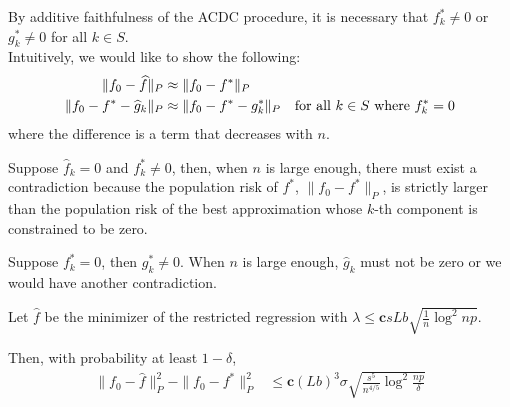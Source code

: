 By additive faithfulness of the ACDC procedure, it is necessary that $f^*_k \neq 0$ or $g^*_k \neq 0$ for all $k \in S$. \\


Intuitively, we would like to show the following:
\begin{align*}
\| f_0 - \widehat{f} \|_P & \approx \| f_0 - f^* \|_P \\
\| f_0 - f^* - \widehat{g}_k \|_P & \approx \| f_0 - f^* - g^*_k \|_P 
       \quad \textrm{for all $k \in S$ where $f^*_k = 0$}
\end{align*}
where the difference is a term that decreases with $n$.

Suppose $\hat{f}_k = 0$ and $f^*_k \neq 0$, then, when $n$ is large enough, there must exist a contradiction because the population risk of $f^*$, $\| f_0 - f^* \|_P$, is strictly larger than the population risk of the best approximation whose $k$-th component is constrained to be zero. 

Suppose $f^*_k = 0$, then $g^*_k \neq 0$. When $n$ is large enough, $\hat{g}_k$ must not be zero or we would have another contradiction. \\


\begin{theorem}
\label{thm:convex_consistent}
Let $\hat{f}$ be the minimizer of the restricted regression with $\lambda \leq \mathbf{c} sLb\sqrt{ \frac{1}{n} \log^2 np}$.

Then, with probability at least $1-\delta$,
\begin{align}
\|f_0 - \hat{f} \|_P^2 - \| f_0 - f^* \|_P^2 
&\leq \mathbf{c} (Lb)^3\sigma \sqrt{ \frac{s^5}{n^{4/5}} \log^2 \frac{np}{\delta}}
\end{align}

\end{theorem}


